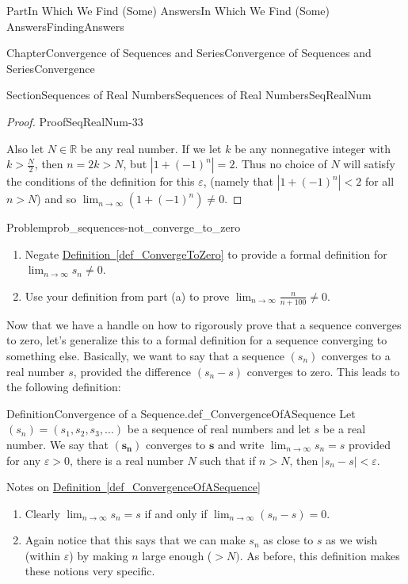 \documentclass[oneside,10pt,]{book}
\newcommand{\xreffont}{\relax}
\numberwithin{equation}{part}
\def\limit#1#2#3{{\displaystyle\lim_{#1\rightarrow #2}#3}}
\def\limitt#1#2#3{{\displaystyle\lim_{#1\rightarrow #2}\textstyle #3}}
\newcommand{\eps}{\varepsilon}
\newcommand{\RR}{\mathbb {R}}
\newcommand{\lt}{<}
\begin{document}
\begin{partptx}{Part}{In Which We Find (Some) Answers}{}{In Which We Find (Some) Answers}{}{}{FindingAnswers}
\begin{chapterptx}{Chapter}{Convergence of Sequences and Series}{}{Convergence of Sequences and Series}{}{}{Convergence}
\begin{sectionptx}{Section}{Sequences of Real Numbers}{}{Sequences of Real Numbers}{}{}{SeqRealNum}
\begin{proof}{Proof}{}{SeqRealNum-33}
\par
Also let \(N\in\RR\) be any real number. If we let \(k\) be any non\textendash{}negative integer with \(k>\frac{N}{2}\), then \(n=2k>N\), but \(|1+(-1)^n|=2\). Thus no choice of \(N\) will satisfy the conditions of the definition for this \(\eps\), (namely that \(|1+(-1)^n|\lt 2\) for all \(n>N\)) and so \(\limit{n}{\infty}{\left(1+(-1)^n\right)}\neq 0\).%
\end{proof}
\begin{problem}{Problem}{}{prob_sequences-not_converge_to_zero}%
\begin{enumerate}[font=\bfseries,label=(\alph*),ref=\alph*]%
\item{}Negate \hyperref[def_ConvergeToZero]{Definition~{\xreffont\ref{def_ConvergeToZero}}} to provide a formal definition for \(\limitt{n}{\infty}{s_n}\neq 0\).%
\item{}Use your definition from part (a) to prove \(\limitt{n}{\infty}{\frac{n}{n+100}}\neq 0\).%
\end{enumerate}%
\end{problem}
Now that we have a handle on how to rigorously prove that a sequence converges to zero, let's generalize this to a formal definition for a sequence converging to something else. Basically, we want to say that a sequence \(\left(s_n\right)\) converges to a real number \(s\), provided the difference \(\left(s_n-s\right)\) converges to zero. This leads to the following definition:%
\begin{definition}{Definition}{Convergence of a Sequence.}{def_ConvergenceOfASequence}%
 Let \(\left(s_n\right)=\left(s_1,s_2,s_3,\ldots\right)\) be a sequence of real numbers and let \(s\) be a real number. We say that \(\left(\boldsymbol{s}_{\boldsymbol{n}}\right)\) converges to \(\boldsymbol{s}\) and write \(\limitt{n}{\infty}{s_n}=s\) provided for any \(\eps>0\), there is a real number \(N\) such that if \(n>N\), then \(|s_n-s|\lt \eps\).%
\end{definition}
Notes on \hyperref[def_ConvergenceOfASequence]{Definition~{\xreffont\ref{def_ConvergenceOfASequence}}}%
\begin{enumerate}
\item{}Clearly \(\limit{n}{\infty}{s_n}=s\) if and only if \(\limit{n}{\infty}{\left(s_n-s\right)}=0\).       %
\item{}Again notice that this says that we can make \(s_n\) as close to \(s\) as we wish (within \(\eps\)) by making \(n\) large enough (\(>N)\). As before, this definition makes these notions very specific.%

\end{enumerate}
\end{sectionptx}
\end{chapterptx}
\end{partptx}
\end{document}
